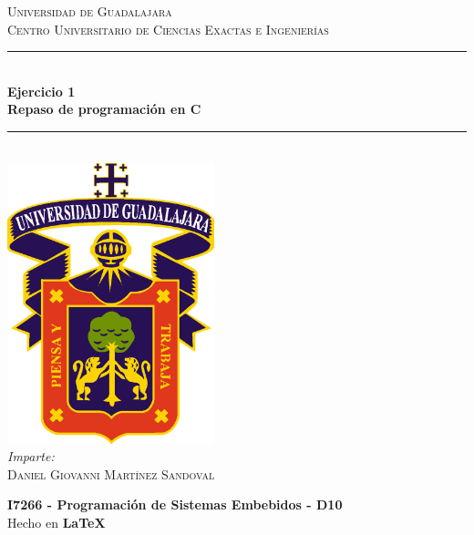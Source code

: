 \documentclass[10pt,letterpaper]{article}
\newcommand{\HRule}{\rule{\linewidth}{0.5mm}} %
\begin{document}

\begin{titlepage}
    \center
    
    \textsc{\LARGE Universidad de Guadalajara}\\[0.2cm] %
    \textsc{Centro Universitario de Ciencias Exactas e Ingenierías}\\[1cm]
    
    \HRule \\[0.3cm]
    { 
        \LARGE \textbf{Ejercicio 1} \\[0.3cm]
        \large \textbf{Repaso de programación en C} \\[0.3cm]
    }
    \HRule \\[2cm]
    
    \includegraphics[width=6cm]{assets/logo_udg_color.eps}\\[1.25cm] %
    
    \center
    \vspace{1cm}
    \emph{Imparte:} \\ %
    \textsc{Daniel Giovanni Martínez Sandoval} 
    
    \vfill
    \textbf{I7266 - Programación de Sistemas Embebidos - D10} \\
    Hecho en \textbf{\LaTeX}	
\end{titlepage}



\end{document}
